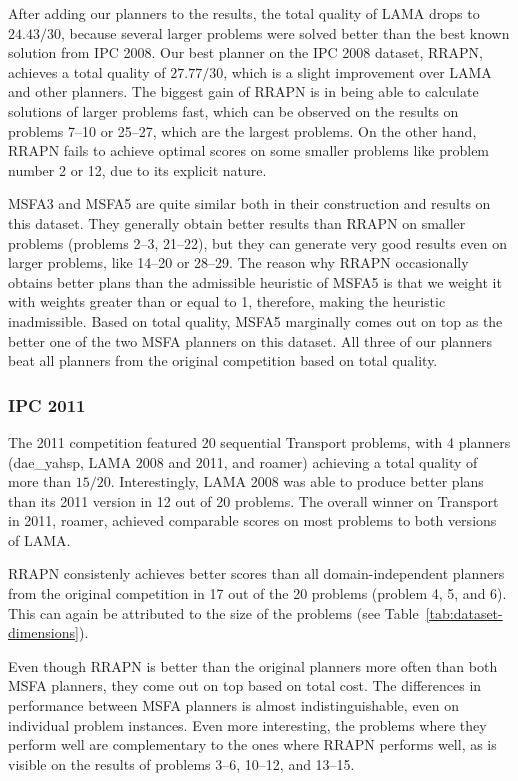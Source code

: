 After adding our planners to the results,
the total quality of LAMA drops to $24.43/30$,
because several larger problems were solved better than the
best known solution from IPC 2008.
Our best planner on the IPC 2008 dataset, RRAPN, achieves a total quality of $27.77/30$,
which is a slight improvement over LAMA and other planners. The biggest gain of RRAPN is in being able to calculate
solutions of larger problems fast, which can be observed on
the results on problems 7--10 or 25--27,
which are the largest problems.
On the other hand, RRAPN fails to achieve optimal scores
on some smaller problems like problem number 2 or 12,
due to its explicit nature.

MSFA3 and MSFA5 are quite similar both in their construction and results on this dataset.
They generally obtain better results than RRAPN on smaller problems
(problems 2--3, 21--22),
but they can generate very good results even on larger problems,
like 14--20 or 28--29.
The reason why RRAPN occasionally obtains better plans than the
admissible heuristic of MSFA5 is that we weight it
with weights greater than or equal to 1,
therefore, making the heuristic inadmissible.
Based on total quality, MSFA5 marginally comes out on top as the better one of the two MSFA planners on this dataset.
All three of our planners beat all planners from the original competition based on total quality.

\subsubsection{IPC 2011}

The 2011 competition featured 20 sequential Transport problems,
with 4 planners (dae\_yahsp, LAMA 2008 and 2011, and roamer) achieving a total quality of more than $15/20$.
Interestingly, LAMA 2008 was able to produce better plans than its 2011 version in 12 out of 20 problems. The overall winner on Transport in 2011, roamer, achieved comparable scores on most problems to both versions of LAMA.

RRAPN consistenly achieves better scores than all domain-independent planners from the original competition in 17 out of the 20 problems (problem 4, 5, and 6). This can again be attributed to the size
of the problems (see Table~\ref{tab:dataset-dimensions}).

Even though RRAPN is better than the original planners more often than both MSFA planners,
they come out on top based on total cost.
The differences in performance between MSFA planners
is almost indistinguishable, even on individual problem instances.
Even more interesting, the problems
where they perform well are complementary to the ones where RRAPN performs well,
as is visible on the results of problems 3--6, 10--12, and 13--15.

